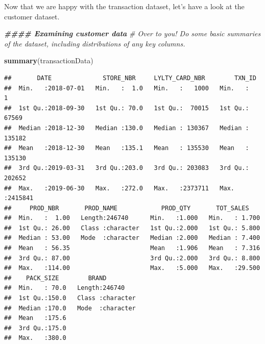 \documentclass[
]{article}
\newenvironment{Shaded}{\begin{snugshade}}{\end{snugshade}}
\newcommand{\AttributeTok}[1]{\textcolor[rgb]{0.13,0.29,0.53}{#1}}
\newcommand{\CommentTok}[1]{\textcolor[rgb]{0.56,0.35,0.01}{\textit{#1}}}
\newcommand{\DocumentationTok}[1]{\textcolor[rgb]{0.56,0.35,0.01}{\textbf{\textit{#1}}}}
\newcommand{\FunctionTok}[1]{\textcolor[rgb]{0.13,0.29,0.53}{\textbf{#1}}}
\newcommand{\NormalTok}[1]{#1}
\newcommand{\OtherTok}[1]{\textcolor[rgb]{0.56,0.35,0.01}{#1}}
\newcommand{\SpecialCharTok}[1]{\textcolor[rgb]{0.81,0.36,0.00}{\textbf{#1}}}
\newcommand{\StringTok}[1]{\textcolor[rgb]{0.31,0.60,0.02}{#1}}
\begin{document}
Now that we are happy with the transaction dataset, let's have a look at
the customer dataset.

\begin{Shaded}
\begin{Highlighting}[]
\DocumentationTok{\#\#\#\# Examining customer data}
\CommentTok{\# Over to you! Do some basic summaries of the dataset, including distributions of any key columns.}

\FunctionTok{summary}\NormalTok{(transactionData)}
\end{Highlighting}
\end{Shaded}

\begin{verbatim}
##       DATE              STORE_NBR     LYLTY_CARD_NBR        TXN_ID       
##  Min.   :2018-07-01   Min.   :  1.0   Min.   :   1000   Min.   :      1  
##  1st Qu.:2018-09-30   1st Qu.: 70.0   1st Qu.:  70015   1st Qu.:  67569  
##  Median :2018-12-30   Median :130.0   Median : 130367   Median : 135182  
##  Mean   :2018-12-30   Mean   :135.1   Mean   : 135530   Mean   : 135130  
##  3rd Qu.:2019-03-31   3rd Qu.:203.0   3rd Qu.: 203083   3rd Qu.: 202652  
##  Max.   :2019-06-30   Max.   :272.0   Max.   :2373711   Max.   :2415841  
##     PROD_NBR       PROD_NAME            PROD_QTY       TOT_SALES     
##  Min.   :  1.00   Length:246740      Min.   :1.000   Min.   : 1.700  
##  1st Qu.: 26.00   Class :character   1st Qu.:2.000   1st Qu.: 5.800  
##  Median : 53.00   Mode  :character   Median :2.000   Median : 7.400  
##  Mean   : 56.35                      Mean   :1.906   Mean   : 7.316  
##  3rd Qu.: 87.00                      3rd Qu.:2.000   3rd Qu.: 8.800  
##  Max.   :114.00                      Max.   :5.000   Max.   :29.500  
##    PACK_SIZE        BRAND          
##  Min.   : 70.0   Length:246740     
##  1st Qu.:150.0   Class :character  
##  Median :170.0   Mode  :character  
##  Mean   :175.6                     
##  3rd Qu.:175.0                     
##  Max.   :380.0
\end{verbatim}

\begin{Shaded}
\end{Shaded}
\end{document}
